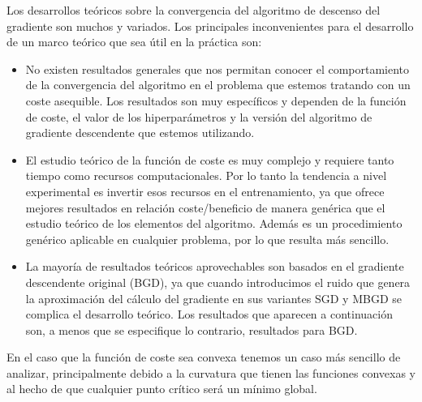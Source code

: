 Los desarrollos teóricos sobre la convergencia del algoritmo de descenso del gradiente son muchos y variados. Los principales inconvenientes para el desarrollo de un marco teórico que sea útil en la práctica son:

\begin{itemize}

    \item No existen resultados generales que nos permitan conocer el comportamiento de la convergencia del algoritmo en el problema que estemos tratando con un coste asequible. Los resultados son muy específicos y dependen de la función de coste, el valor de los hiperparámetros y la versión del algoritmo de gradiente descendente que estemos utilizando.

    \item El estudio teórico de la función de coste es muy complejo y requiere tanto tiempo como recursos computacionales. Por lo tanto la tendencia a nivel experimental es invertir esos recursos en el entrenamiento, ya que ofrece mejores resultados en relación coste/beneficio de manera genérica que el estudio teórico de los elementos del algoritmo. Además es un procedimiento genérico aplicable en cualquier problema, por lo que resulta más sencillo.

    \item La mayoría de resultados teóricos aprovechables son basados en el gradiente descendente original (BGD), ya que cuando introducimos el ruido que genera la aproximación del cálculo del gradiente en sus variantes SGD y MBGD se complica el desarrollo teórico. Los resultados que aparecen a continuación son, a menos que se especifique lo contrario, resultados para BGD.
   
\end{itemize}


En el caso que la función de coste sea convexa tenemos un caso más sencillo de analizar, principalmente debido a la curvatura que tienen las funciones convexas y al hecho de que cualquier punto crítico será un mínimo global.


